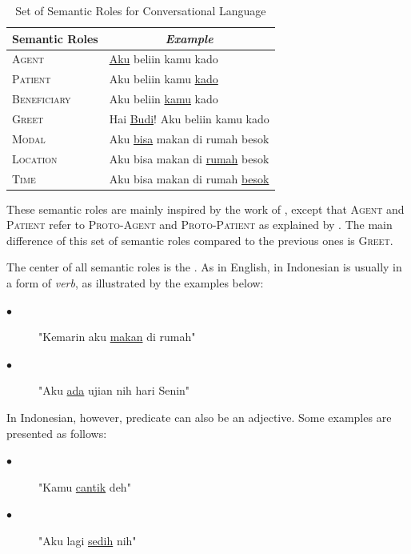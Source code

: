 \begin{table}
	\centering
	\caption{Set of Semantic Roles for Conversational Language}
	\label{tab:semantic_roles}
	\begin{tabular}{|l|l|}
		\hline
		\multicolumn{1}{|c|}{Semantic Roles} & \multicolumn{1}{c|}{\textit{Example}} \\
		\hline
		\textsc{Agent}		& \underline{Aku} beliin kamu kado\\
		\textsc{Patient}		& Aku beliin kamu \underline{kado}\\
		\textsc{Beneficiary}	& Aku beliin \underline{kamu} kado\\
		\textsc{Greet} 				& Hai \underline{Budi}! Aku beliin kamu kado\\
		\textsc{Modal} 				& Aku \underline{bisa} makan di rumah besok\\
		\textsc{Location} 			& Aku bisa makan di \underline{rumah} besok\\
		\textsc{Time} 				& Aku bisa makan di rumah \underline{besok} \\
		\hline
	\end{tabular}
\end{table}

These semantic roles are mainly inspired by the work of \cite{saeed19972003}, except that \textsc{Agent} and \textsc{Patient} refer to \textsc{Proto-Agent} and \textsc{Proto-Patient} as explained by \cite{dowty1991thematic}. The main difference of this set of semantic roles compared to the previous ones is \textsc{Greet}.

The center of all semantic roles is the \predicate. As in English, \predicate in Indonesian is usually in a form of \textit{verb}, as illustrated by the examples below:
\begin{description}
	\item[$\bullet$] "Kemarin aku \underline{makan} di rumah"
	\item[$\bullet$] "Aku \underline{ada} ujian nih hari Senin"
\end{description}

In Indonesian, however, predicate can also be an adjective. Some examples are presented as follows:
\begin{description}
	\item[$\bullet$] "Kamu \underline{cantik} deh"
	\item[$\bullet$] "Aku lagi \underline{sedih} nih"
\end{description}


